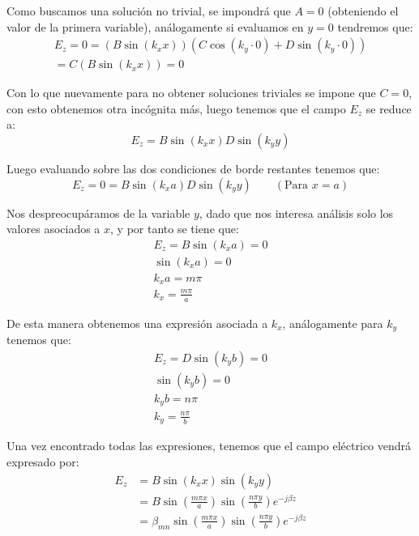 \documentclass[
  11pt,
  letterpaper,
   addpoints,
   answers
  ]{exam}
\begin{document}
\begin{questions}
\begin{solution}
Como buscamos una solución no trivial, se impondrá que $A = 0$ (obteniendo el valor de la primera variable), análogamente si evaluamos en $y = 0$ tendremos que:
\begin{align}
    E_z = 0 = (B \sin(k_x x))(C \cos(k_y \cdot 0) + D \sin(k_y \cdot 0)) \\
    = C(B \sin(k_x x)) = 0 \tag{40}
\end{align}

Con lo que nuevamente para no obtener soluciones triviales se impone que $C = 0$, con esto obtenemos otra incógnita más, luego tenemos que el campo $E_z$ se reduce a:
\begin{equation}
    E_z = B \sin(k_x x) D \sin(k_y y) \tag{41}
\end{equation}

Luego evaluando sobre las dos condiciones de borde restantes tenemos que:
\begin{equation}
    E_z = 0 = B \sin(k_x a) D \sin(k_y y) \qquad (\text{Para } x=a) \tag{42}
\end{equation}

Nos despreocupáramos de la variable $y$, dado que nos interesa análisis solo los valores asociados a $x$, y por tanto se tiene que:
\begin{align}
    E_z = B \sin(k_x a) = 0 \tag{43} \\
    \sin(k_x a) = 0 \tag{44} \\
    k_x a = m\pi \tag{45} \\
    k_x = \frac{m\pi}{a} \tag{46}
\end{align}

De esta manera obtenemos una expresión asociada a $k_x$, análogamente para $k_y$ tenemos que:
\begin{align}
    E_z = D \sin(k_y b) = 0 \tag{47} \\
    \sin(k_y b) = 0 \tag{48} \\
    k_y b = n\pi \tag{49} \\
    k_y = \frac{n\pi}{b} \tag{50}
\end{align}

Una vez encontrado todas las expresiones, tenemos que el campo eléctrico vendrá expresado por:
\begin{align}
    E_z &= B \sin(k_x x) \sin(k_y y) \tag{51} \\
        &= B \sin\left(\frac{m\pi x}{a}\right) \sin\left(\frac{n\pi y}{b}\right) e^{-j\beta z} \tag{52} \\
        &= \beta_{mn} \sin\left(\frac{m\pi x}{a}\right) \sin\left(\frac{n\pi y}{b}\right) e^{-j\beta z} \tag{53}
\end{align}


\end{solution}
\end{questions}
\end{document}
